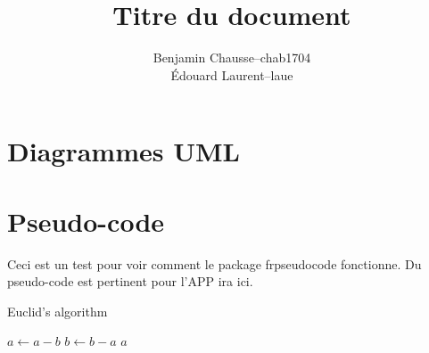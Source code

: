 \documentclass[a11paper, 11pt]{article}
\title{Titre du document}
\author{
  \addtolength{\tabcolsep}{-0.4em}
  \begin{tabular}{rcl} %
  Benjamin Chausse & -- & chab1704 \\
  Édouard Laurent  & -- & laue \\ %
  \end{tabular}
}
\begin{document}
\maketitle
\newpage

\section{Diagrammes UML}

\section{Pseudo-code}

Ceci est un test pour voir comment le package frpseudocode fonctionne.
Du pseudo-code est pertinent pour l'APP ira ici.

\begin{algorithm}
\caption{Euclid's algorithm}\label{alg:euclid}
\begin{algorithmic}[1]
        \State $a \gets a - b$
      \Else
        \State $b \gets b - a$
      \EndIf
    \EndWhile
    \State \Return $a$
  \EndFunction
\end{algorithmic}
\end{algorithm}



\end{document}
